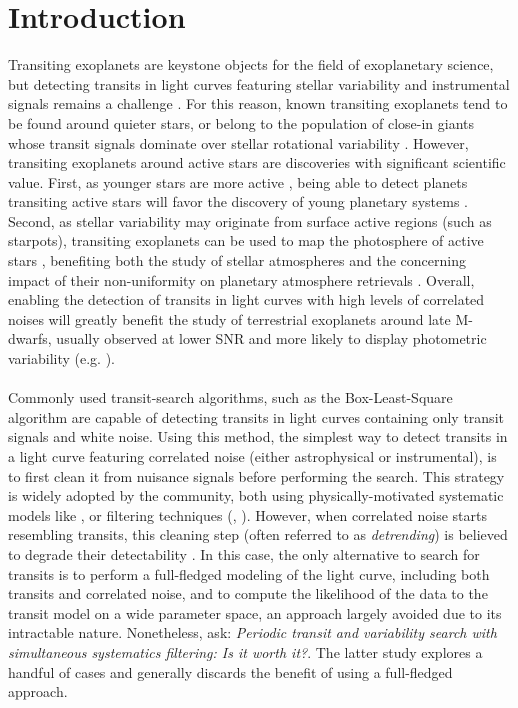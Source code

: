 \documentclass[modern]{aastex631}
\begin{document}
\section*{Introduction}
Transiting exoplanets are keystone objects for the field of exoplanetary science, but detecting transits in light curves featuring stellar variability and instrumental signals remains a challenge \citep{Pont2006,Howell2016}. For this reason, known transiting exoplanets tend to be found around quieter stars, or belong to the population of close-in giants whose transit signals dominate over stellar rotational variability \citep{Simpson2023}. However, transiting exoplanets around active stars are discoveries with significant scientific value. First, as younger stars are more active \citep{Skumanich1972}, being able to detect planets transiting active stars will favor the discovery of young planetary systems \citep[e.g.][]{Newton2022}. Second, as stellar variability may originate from surface active regions (such as starpots), transiting exoplanets can be used to map the photosphere of active stars \citep[e.g.][]{Morris2017}, benefiting both the study of stellar atmospheres and the concerning impact of their non-uniformity on planetary atmosphere retrievals \citep{rackham2018}. Overall, enabling the detection of transits in light curves with high levels of correlated noises will greatly benefit the study of terrestrial exoplanets around late M-dwarfs, usually observed at lower SNR and more likely to display photometric variability (e.g. \citealt{Murray2020}).
\\\\
Commonly used transit-search algorithms, such as the Box-Least-Square algorithm \citep[BLS,][]{bls} are capable of detecting transits in light curves containing only transit signals and white noise. Using this method, the simplest way to detect transits in a light curve featuring correlated noise (either astrophysical or instrumental), is to first clean it from nuisance signals before performing the search. This strategy is widely adopted by the community, both using physically-motivated systematic models like \cite{everest1, everest2}, or filtering techniques (\citealt{Jenkins2010}, \citealt{wotan}). However, when correlated noise starts resembling transits, this cleaning step (often referred to as \textit{detrending}) is believed to degrade their detectability \cite[see subsection 4.3 of][]{wotan}. In this case, the only alternative to search for transits is to perform a full-fledged modeling of the light curve, including both transits and correlated noise, and to compute the likelihood of the data to the transit model on a wide parameter space, an approach largely avoided due to its intractable nature. Nonetheless, \cite{kovacs2016} ask: \textit{Periodic transit and variability search with simultaneous systematics filtering: Is it worth it?}. The latter study explores a handful of cases and generally discards the benefit of using a full-fledged approach.\\\\
\end{document}
